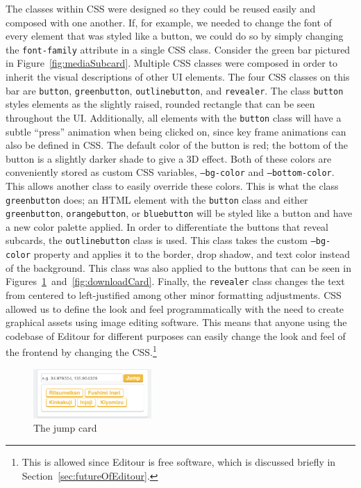 \documentclass[a4paper, 10pt, american, titlepage]{article}
\begin{document}
The classes within CSS were designed so they could be reused easily and composed
with one another. If, for example, we needed to change the font of every element
that was styled like a button, we could do so by simply changing the
\texttt{font-family} attribute in a single CSS class. Consider the green bar
pictured in Figure~\ref{fig:mediaSubcard}. Multiple CSS classes were composed in
order to inherit the visual descriptions of other UI elements. The four CSS
classes on this bar are \texttt{button}, \texttt{greenbutton},
\texttt{outlinebutton}, and \texttt{revealer}. The class \texttt{button} styles
elements as the slightly raised, rounded rectangle that can be seen throughout
the UI. Additionally, all elements with the \texttt{button} class will have a
subtle ``press'' animation when being clicked on, since key frame animations can
also be defined in CSS. The default color of the button is red; the bottom of
the button is a slightly darker shade to give a 3D effect. Both of these colors
are conveniently stored as custom CSS variables, \texttt{--bg-color} and
\texttt{--bottom-color}. This allows another class to easily override these
colors. This is what the class \texttt{greenbutton} does; an HTML element with
the \texttt{button} class and either \texttt{greenbutton},
\texttt{orangebutton}, or \texttt{bluebutton} will be styled like a button and
have a new color palette applied. In order to differentiate the buttons that
reveal subcards, the \texttt{outlinebutton} class is used. This class takes the
custom \texttt{--bg-color} property and applies it to the border, drop shadow,
and text color instead of the background. This class was also applied to the
buttons that can be seen in
Figures~\ref{fig:jumpCard}~and~\ref{fig:downloadCard}. Finally, the
\texttt{revealer} class changes the text from centered to left-justified among
other minor formatting adjustments. CSS allowed us to define the look and feel
programmatically with the need to create graphical assets using image editing
software. This means that anyone using the codebase of Editour for different
purposes can easily change the look and feel of the frontend by changing the
CSS.\footnote{This is allowed since Editour is free software, which is discussed
briefly in Section~\ref{sec:futureOfEditour}.}

\begin{figure}[h]
	\centering
    \includegraphics[width=0.4\textwidth]{jump-card-editour.png}
    \caption{The jump card}
	\label{fig:jumpCard}
\end{figure}
\end{document}
